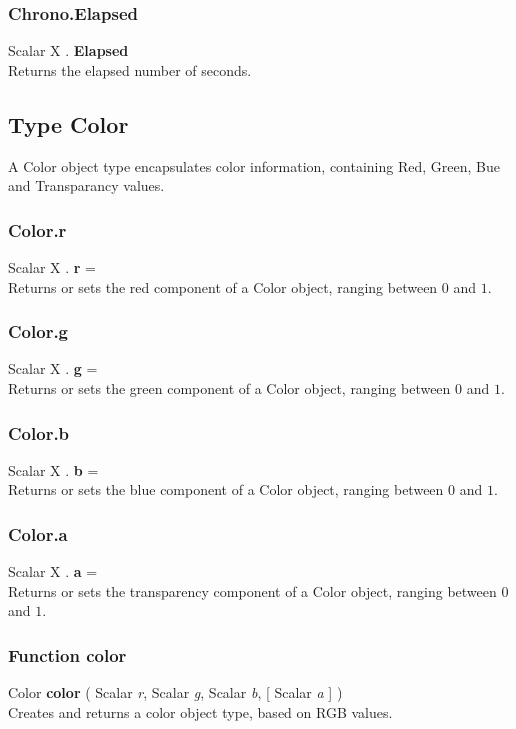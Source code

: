 \documentclass[10pt]{book}
\begin{document}
\subsubsection{Chrono.Elapsed \label{F:Chrono:Elapsed}}
Scalar X . \textbf{Elapsed} \\
Returns the elapsed number of seconds.

\subsection{Type Color \label{T:Color}}
A Color object type encapsulates color information, containing Red, Green, Bue and Transparancy values.

\subsubsection{Color.r \label{F:Color:r}}
Scalar X . \textbf{r} = \\
Returns or sets the red component of a Color object, ranging between $0$ and $1$.

\subsubsection{Color.g \label{F:Color:g}}
Scalar X . \textbf{g} = \\
Returns or sets the green component of a Color object, ranging between $0$ and $1$.


\subsubsection{Color.b \label{F:Color:b}}
Scalar X . \textbf{b} = \\
Returns or sets the blue component of a Color object, ranging between $0$ and $1$.


\subsubsection{Color.a \label{F:Color:a}}
Scalar X . \textbf{a} = \\
Returns or sets the transparency component of a Color object, ranging between $0$ and $1$.


\subsubsection{Function color \label{F:color}}
Color \textbf{color} ( Scalar \textit{r}, Scalar \textit{g}, Scalar \textit{b},  [ Scalar \textit{a} ] ) \\
Creates and returns a color object type, based on RGB values.
\end{document}
